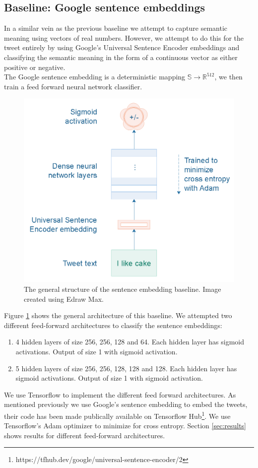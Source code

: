 \documentclass[conference]{IEEEtran}
\begin{document}
\subsection{Baseline: Google sentence embeddings}
In a similar vein as the previous baseline we attempt to capture semantic meaning using vectors of real numbers. However, we attempt to do this for the tweet entirely by using Google's Universal Sentence Encoder embeddings \cite{GOOGLE_SENTENCE} and classifying the semantic meaning in the form of a continuous vector as either positive or negative.\\
\indent The Google sentence embedding is a deterministic mapping $\mathbb{S} \rightarrow \mathbb{R}^{512}$, we then train a feed forward neural network classifier.
	\begin{figure}[h!]
    	\centering
		\includegraphics[scale=0.55]{fig/sentence_embedding.PNG}
        \caption{The general structure of the sentence embedding baseline. Image created using Edraw Max\cite{Edraw}.}
        \label{fig:sentence_embedding}
	\end{figure}
	Figure \ref{fig:sentence_embedding} shows the general architecture of this baseline. We attempted two different feed-forward architectures to classify the sentence embeddings:
\begin{enumerate}
	\item 4 hidden layers of size 256, 256, 128 and 64. Each hidden layer has sigmoid activations. Output of size 1 with sigmoid activation.
	\item 5 hidden layers of size 256, 256, 128, 128 and 128. Each hidden layer has sigmoid activations. Output of size 1 with sigmoid activation.
\end{enumerate} 
We use Tensorflow \cite{tensorflow} to implement the different feed forward architectures. As mentioned previously we use Google's sentence embedding \cite{GOOGLE_SENTENCE} to embed the tweets, their code has been made publically available on Tensorflow Hub\footnote{https://tfhub.dev/google/universal-sentence-encoder/2}. We use Tensorflow's Adam optimizer to minimize for cross entropy. Section \ref{sec:results} shows results for different feed-forward architectures.
		
\end{document}

